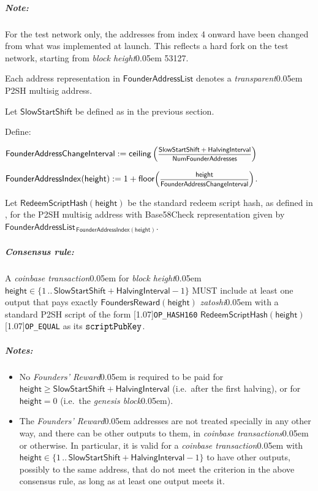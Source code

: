 \documentclass{article}
\let\oldtexttt\texttt
\let\oldmathtt\mathtt
\renewcommand{\texttt}[1]{\scalebox{1.02}[1.07]{\oldtexttt{#1}}}
\renewcommand{\mathtt}[1]{\scalebox{1.02}[1.07]{$\oldmathtt{#1}$}}
\newcommand{\textbnx}[1]{{\fontseries{b}\selectfont #1}}
\renewcommand{\arraystretch}{1.4}
\newcommand{\introlist}{\needspace{15ex}}
\newcommand{\hfrac}[2]{\scalebox{0.8}{$\genfrac{}{}{0.5pt}{0}{#1}{#2}$}}
\numberwithin{theorem}{subsection}
\newcommand{\term}[1]{\textsl{#1}\kern 0.05em\xspace}
\newcommand{\conformance}[1]{\textbnx{#1}\xspace}
\newcommand{\zatoshi}{\term{zatoshi}}
\newcommand{\MUST}{\conformance{MUST}}
\newcommand{\blockHeight}{\term{block height}}
\newcommand{\genesisBlock}{\term{genesis block}}
\newcommand{\coinbaseTransaction}{\term{coinbase transaction}}
\newcommand{\coinbaseTransactions}{\term{coinbase transactions}}
\newcommand{\transparent}{\term{transparent}}
\newcommand{\setof}[1]{\{{#1}\}}
\newcommand{\barerange}[2]{{#1}\,..\,{#2}}
\newcommand{\range}[2]{\setof{\barerange{#1}{#2}}}
\newcommand{\floor}[1]{\mathsf{floor}\!\left({#1}\right)}
\newcommand{\ceiling}[1]{\mathsf{ceiling}\left({#1}\right)}
\newcommand{\FoundersReward}{\mathsf{FoundersReward}}
\newcommand{\SlowStartShift}{\mathsf{SlowStartShift}}
\newcommand{\HalvingInterval}{\mathsf{HalvingInterval}}
\newcommand{\NumFounderAddresses}{\mathsf{NumFounderAddresses}}
\newcommand{\FounderAddressChangeInterval}{\mathsf{FounderAddressChangeInterval}}
\newcommand{\BlockHeight}{\mathsf{height}}
\newcommand{\FounderAddressList}{\mathsf{FounderAddressList}}
\newcommand{\FounderAddressIndex}{\mathsf{FounderAddressIndex}}
\newcommand{\RedeemScriptHash}{\mathsf{RedeemScriptHash}}
\newcommand{\foundersReward}{\term{Founders' Reward}}
\newcommand{\scriptPubKey}{\mathtt{scriptPubKey}}
\newcommand{\ScriptOP}[1]{\texttt{OP\_{#1}}}
\newcommand{\consensusrule}[1]{\needspace{3ex}\subparagraph{Consensus rule:}{#1}}
\newcommand{\pnote}[1]{\subparagraph{Note:}{#1}}
\newenvironment{pnotes}{\introlist\subparagraph{Notes:}\begin{itemize}}{\end{itemize}}
\begin{document}
\renewcommand{\arraystretch}{1}

\pnote{For the test network only, the addresses from index 4 onward have been changed from
what was implemented at launch. This reflects a hard fork on the test network, starting
from \blockHeight 53127. \cite{ZcashIssue-2113}}

Each address representation in $\FounderAddressList$ denotes a \transparent
P2SH multisig address.

\introlist
Let $\SlowStartShift$ be defined as in the previous section.

Define:

\begin{formulae}
  \item $\FounderAddressChangeInterval := \ceiling{\hfrac{\SlowStartShift + \HalvingInterval}{\NumFounderAddresses}}$
  \item $\FounderAddressIndex(\BlockHeight) := 1 + \floor{\hfrac{\BlockHeight}{\FounderAddressChangeInterval}}$.
\end{formulae}

Let $\RedeemScriptHash(\BlockHeight)$ be the standard redeem script hash, as defined in
\cite{Bitc-Multisig}, for the P2SH multisig address with Base58Check representation
given by $\FounderAddressList_{\,\FounderAddressIndex(\BlockHeight)}$.

\consensusrule{
A \coinbaseTransaction for \blockHeight $\BlockHeight \in \range{1}{\SlowStartShift + \HalvingInterval - 1}$
\MUST include at least one output that pays exactly $\FoundersReward(\BlockHeight)$ \zatoshi
with a standard P2SH script of the form \ScriptOP{HASH160} \;$\RedeemScriptHash(\BlockHeight)$\; \ScriptOP{EQUAL}
as its $\scriptPubKey$.
}

\begin{pnotes}
  \item No \foundersReward is required to be paid for $\BlockHeight \geq \SlowStartShift + \HalvingInterval$
        (i.e.\ after the first halving), or for $\BlockHeight = 0$ (i.e.\ the \genesisBlock).
  \item The \foundersReward addresses are not treated specially in any other way, and
        there can be other outputs to them, in \coinbaseTransactions or otherwise.
        In particular, it is valid for a \coinbaseTransaction with
        $\BlockHeight \in \range{1}{\SlowStartShift + \HalvingInterval - 1}$ to have
        other outputs, possibly to the same address, that do not meet the criterion
        in the above consensus rule, as long as at least one output meets it.
\end{pnotes}
\end{document}
